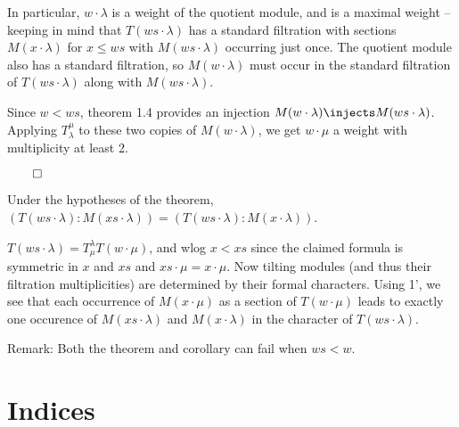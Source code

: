 In particular, \(w\cdot \lambda\) is a weight of the quotient module,
and is a maximal weight -- keeping in mind that \(T(ws\cdot \lambda)\)
has a standard filtration with sections \(M(x\cdot \lambda)\) for
\(x \leq ws\) with \(M(ws\cdot \lambda)\) occurring just once. The
quotient module also has a standard filtration, so \(M(w\cdot \lambda)\)
must occur in the standard filtration of \(T(ws\cdot \lambda)\) along
with \(M(ws\cdot \lambda)\).

Since \(w<ws\), theorem 1.4 provides an injection
\(M(w\cdot \lambda) \injects M(ws\cdot \lambda)\). Applying
\(T_\lambda^\mu\) to these two copies of \(M(w\cdot \lambda)\), we get
\(w\cdot \mu\) a weight with multiplicity at least 2.

\(\qed\)

\begin{description}
\tightlist
\item[Corollary (Standard Multiplicities of Vermas in Tilting Modules)]
Under the hypotheses of the theorem,
\((T(ws\cdot \lambda): M(xs \cdot \lambda)) = (T(ws\cdot \lambda) : M(x\cdot \lambda))\).
\item[Proof]
\(T(ws\cdot \lambda) = T_\mu^\lambda T(w\cdot \mu)\), and wlog
\(x < xs\) since the claimed formula is symmetric in \(x\) and \(xs\)
and \(xs\cdot \mu = x\cdot \mu\). Now tilting modules (and thus their
filtration multiplicities) are determined by their formal characters.
Using 1', we see that each occurrence of \(M(x\cdot \mu)\) as a section
of \(T(w\cdot \mu)\) leads to exactly one occurence of
\(M(xs\cdot \lambda)\) and \(M(x\cdot \lambda)\) in the character of
\(T(ws \cdot \lambda)\).
\end{description}

Remark: Both the theorem and corollary can fail when \(ws<w\).

\newpage

\newpage
\section{Indices}

\renewcommand{\listtheoremname}{Definitions}
\listoftheorems[ignoreall,show={definition}, numwidth=3.5em]

\renewcommand{\listtheoremname}{Theorems}
\listoftheorems[ignoreall,show={theorem,proposition}, numwidth=3.5em]

\renewcommand{\listtheoremname}{Exercises}
\listoftheorems[ignoreall,show={exercise}, numwidth=3.5em]

\listoffigures


\printbibliography[title=Bibliography]



